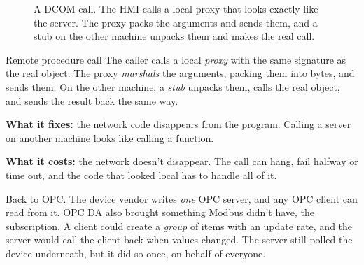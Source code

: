\begin{figure}[htbp]
\centering
{}
\caption{A DCOM call. The HMI calls a local proxy that looks exactly like the
server. The proxy packs the arguments and sends them, and a stub on the other
machine unpacks them and makes the real call.}
\end{figure}

\begin{concept}{Remote procedure call}
The caller calls a local \emph{proxy} with the same signature as the real
object. The proxy \emph{marshals} the arguments, packing them into bytes, and
sends them. On the other machine, a \emph{stub} unpacks them, calls the real
object, and sends the result back the same way.

\textbf{What it fixes:} the network code disappears from the program. Calling a
server on another machine looks like calling a function.

\textbf{What it costs:} the network doesn't disappear. The call can hang, fail
halfway or time out, and the code that looked local has to handle all of it.
\end{concept}

Back to OPC. The device vendor writes \emph{one} OPC server, and any OPC client
can read from it. OPC DA also brought something Modbus didn't have, the subscription. A client
could create a \emph{group} of items with an update rate, and the server would
call the client back when values changed. The server still polled the device
underneath, but it did so once, on behalf of everyone.

